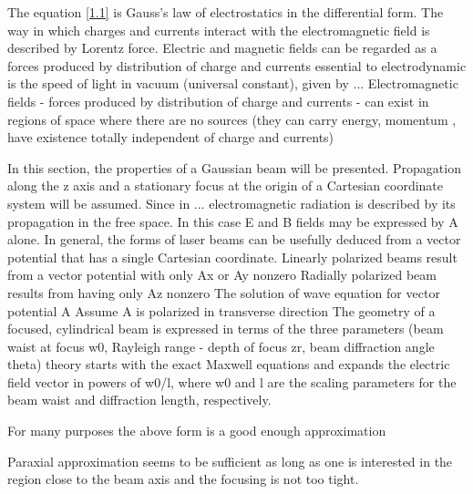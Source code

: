 The equation \ref{1.1} is Gauss's law of electrostatics in the differential form. 
The way in which charges and currents interact with the electromagnetic field is described by Lorentz force.
Electric and magnetic fields can be regarded as a forces produced by distribution of charge and currents
essential to electrodynamic is the speed of light in vacuum (universal constant), given by ...
Electromagnetic fields - forces produced by distribution of charge and currents - can exist in regions of space where there are no sources (they can carry energy, momentum , have existence totally independent of charge and currents) 

In this section, the properties of a Gaussian beam will be presented.
Propagation along the z axis and a stationary
focus at the origin of a Cartesian coordinate system will be
assumed.
Since in ... electromagnetic radiation is described by its propagation in the free space.
In this case E and B fields may be expressed by A alone. 
In general, the forms of laser beams can be usefully deduced from a vector potential that
has a single Cartesian coordinate.
Linearly polarized beams result from a vector potential with only Ax or Ay nonzero
Radially polarized beam results from having only Az nonzero
The solution of wave equation for vector potential A
Assume A is polarized in transverse direction 
The geometry of a focused, cylindrical beam is expressed in terms
of the three parameters (beam waist at focus w0, Rayleigh range - depth of focus zr, beam diffraction angle theta)
theory starts with the exact Maxwell equations and expands the electric field vector in powers of w0/l, where w0 and l are the scaling parameters for the beam waist and diffraction length, respectively.

For many purposes the above form is a good enough approximation

Paraxial approximation seems to be sufficient as long as one is interested in the region close to the beam axis and the focusing is not too tight.